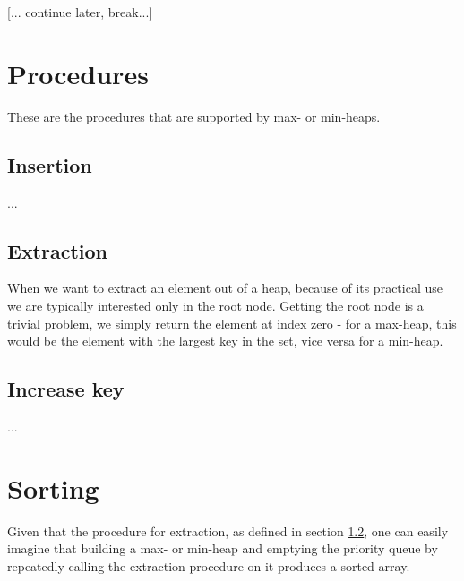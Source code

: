 [... continue later, break...]

\newpage

\section{Procedures}
\label{ch:heaps|sec:procedures}
These are the procedures that are supported by max- or min-heaps.

\subsection{Insertion}
\label{ch:heaps|sec:procedures|sub:insertion}
...


\subsection{Extraction}
\label{ch:heaps|sec:procedures|sub:extraction}
When we want to extract an element out of a heap, because of its practical use
we are typically interested only in the root node. Getting the root node is a
trivial problem, we simply return the element at index zero - for a max-heap,
this would be the element with the largest key in the set, vice versa for a
min-heap.


\subsection{Increase key}
\label{ch:heaps|sec:procedures|sub:increase-key}
...



\section{Sorting}
Given that the procedure for extraction, as defined in section
\ref{ch:heaps|sec:procedures|sub:extraction}, one can easily imagine that
building a max- or min-heap and emptying the priority queue by repeatedly
calling the extraction procedure on it produces a sorted array.

